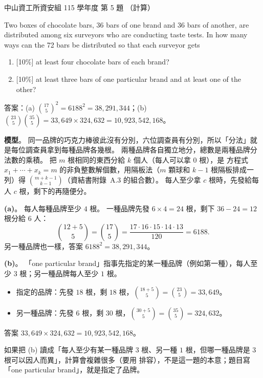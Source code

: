 \begin{pastexam}[label={px:nsysu-115-dmalg-04}]{中山資工所資安組 115 學年度 第 5 題}
（計算）

Two boxes of chocolate bars, 36 bars of one brand and 36 bars of another, are distributed among six surveyors who are conducting taste tests. In how many ways can the 72 bars be distributed so that each surveyor gets
\begin{enumerate}[label=(\alph*)]
\item {[}10\%{]} at least four chocolate bars of each brand?
\item {[}10\%{]} at least three bars of one particular brand and at least one of the other?
\end{enumerate}
\end{pastexam}

\begin{pastsoln}
答案：(a) $\binom{17}{5}^2 = 6188^2 = 38{,}291{,}344$；(b) $\binom{23}{5}\binom{35}{5} = 33{,}649 \times 324{,}632 = 10{,}923{,}542{,}168$。

\textbf{模型}。 同一品牌的巧克力棒彼此沒有分別，六位調查員有分別，所以「分法」就是每位調查員拿到每種品牌各幾根。
兩種品牌各自獨立地分，總數是兩種品牌分法數的乘積。 把 $m$ 根相同的東西分給 $k$ 個人（每人可以拿 $0$ 根），是
方程式 $x_1 + \cdots + x_k = m$ 的非負整數解個數，用隔板法（$m$ 顆球和 $k - 1$ 根隔板排成一列）得
$\binom{m + k - 1}{k - 1}$（資結書附錄~A.3 的組合數）。 每人至少拿 $c$ 根時，先發給每人 $c$ 根，剩下的再隨便分。

\textbf{(a)}。 每人每種品牌至少 $4$ 根。 一種品牌先發 $6 \times 4 = 24$ 根，剩下 $36 - 24 = 12$ 根分給 $6$ 人：
\[
\binom{12 + 5}{5} = \binom{17}{5} = \frac{17 \cdot 16 \cdot 15 \cdot 14 \cdot 13}{120} = 6188 .
\]
另一種品牌也一樣，答案 $6188^2 = 38{,}291{,}344$。

\textbf{(b)}。 「one particular brand」指事先指定的某一種品牌（例如第一種），每人至少 $3$ 根；另一種品牌每人至少 $1$ 根。
\begin{itemize}
\item 指定的品牌：先發 $18$ 根，剩 $18$ 根，$\binom{18 + 5}{5} = \binom{23}{5} = 33{,}649$。
\item 另一種品牌：先發 $6$ 根，剩 $30$ 根，$\binom{30 + 5}{5} = \binom{35}{5} = 324{,}632$。
\end{itemize}
答案 $33{,}649 \times 324{,}632 = 10{,}923{,}542{,}168$。

如果把 (b) 讀成「每人至少有某一種品牌 $3$ 根、另一種 $1$ 根，但哪一種品牌是 $3$ 根可以因人而異」，計算會複雜很多（要用
排容），不是這一題的本意；題目寫「one particular brand」，就是指定了品牌。
\end{pastsoln}
